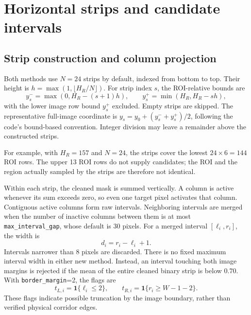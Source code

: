 \section{Horizontal strips and candidate intervals}
\label{sec:c4_candidates}

\subsection{Strip construction and column projection}
\label{subsec:c4_strips}

Both methods use $N=24$ strips by default, indexed from bottom to top.
Their height is $h=\max(1,\lfloor H_R/N\rfloor)$. For strip index $s$,
the ROI-relative bounds are
\begin{equation}
    y_s^- = \max(0,H_R-(s+1)h),\qquad
    y_s^+ = \min(H_R,H_R-sh),
\end{equation}
with the lower image row bound $y_s^+$ excluded. Empty strips are skipped.
The representative full-image coordinate is
$y_s=y_0+(y_s^-+y_s^+)/2$, following the code's bound-based convention.
Integer division may leave a remainder above the constructed strips.

For example, with $H_R=157$ and $N=24$, the strips cover the lowest
$24\times6=144$ ROI rows. The upper 13 ROI rows do not supply candidates;
the ROI and the region actually sampled by the strips are therefore not
identical.

Within each strip, the cleaned mask is summed vertically. A column is
active whenever its sum exceeds zero, so even one target pixel activates
that column. Contiguous active columns form raw intervals. Neighboring
intervals are merged when the number of inactive columns between them
is at most \texttt{max\_interval\_gap}, whose default is 30 pixels.
For a merged interval $[\ell_i,r_i]$, the width is
\begin{equation}
    d_i=r_i-\ell_i+1.
    \label{eq:c4_interval}
\end{equation}
Intervals narrower than 8 pixels are discarded. There is no fixed maximum
interval width in either new method. Instead, an interval touching both
image margins is rejected if the mean of the entire cleaned binary strip
is below 0.70. With \texttt{border\_margin}=2, the flags are
\begin{equation}
    t_{L,i}=\mathbf{1}\{\ell_i\leq2\},\qquad
    t_{R,i}=\mathbf{1}\{r_i\geq W-1-2\}.
\end{equation}
These flags indicate possible truncation by the image boundary, rather
than verified physical corridor edges.

